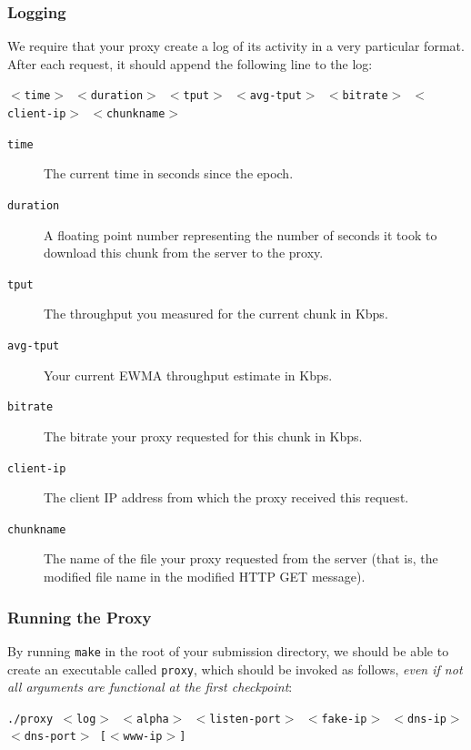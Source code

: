 \documentclass{article}
\begin{document}
\subsubsection{Logging}
\label{sec:proxy-logging}

We require that your proxy create a log of its activity in a very particular
format. After each request, it should append the following line to the log:
\begin{center}
	\texttt{$<$time$>$ $<$duration$>$ $<$tput$>$ $<$avg-tput$>$ $<$bitrate$>$ $<$client-ip$>$ $<$chunkname$>$}
\end{center}

\begin{description}
	\item[\texttt{time}] The current time in seconds since the epoch.
	\item[\texttt{duration}] A floating point number representing the number of
	seconds it took to download this chunk from the server to the proxy.
	\item[\texttt{tput}] The throughput you measured for the current chunk in
	Kbps.
	\item[\texttt{avg-tput}] Your current EWMA throughput estimate in Kbps.
	\item[\texttt{bitrate}] The bitrate your proxy requested for this chunk in
	Kbps.
	\item[\texttt{client-ip}] The client IP address from which the proxy
	received this request.
	\item[\texttt{chunkname}] The name of the file your proxy requested from
	the server (that is, the modified file name in the modified HTTP GET
	message).
\end{description}


\subsubsection{Running the Proxy}
\label{sec:running-proxy}

By running \texttt{make} in the root of your submission directory, we should be
able to create an executable called \texttt{proxy}, which should be invoked as
follows, \emph{even if not all arguments are functional at the first checkpoint}:
\begin{center}
	\texttt{./proxy $<$log$>$ $<$alpha$>$ $<$listen-port$>$ $<$fake-ip$>$ $<$dns-ip$>$ $<$dns-port$>$ [$<$www-ip$>$]}
\end{center}
\end{document}
